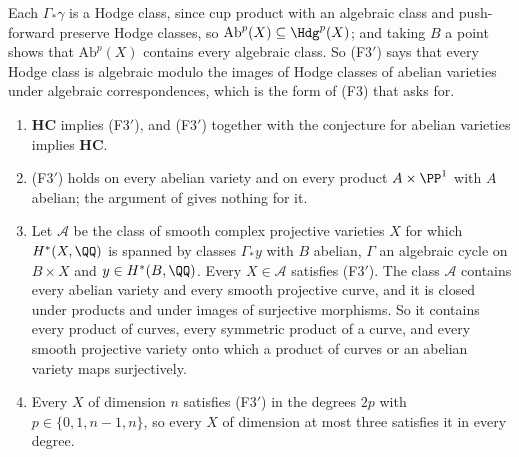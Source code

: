 Each $\Gamma_{*}\gamma$ is a Hodge class, since cup product with an
algebraic class and push-forward preserve Hodge classes, so
$\mathrm{Ab}^{p}(X)\subseteq\Hdg^{p}(X)$; and taking $B$ a point shows that
$\mathrm{Ab}^{p}(X)$ contains every algebraic class. So \textup{(F3$'$)} says
that every Hodge class is algebraic modulo the images of Hodge classes of
abelian varieties under algebraic correspondences, which is the form of (F3)
that  asks for.

\begin{proposition}\label{prop:f3prime}
\leavevmode
\begin{enumerate}[label=\textup{(\roman*)},leftmargin=2.6em]
\item $\mathbf{HC}$ implies \textup{(F3$'$)}, and \textup{(F3$'$)} together
  with the conjecture for abelian varieties implies $\mathbf{HC}$.
\item \textup{(F3$'$)} holds on every abelian variety and on every product
  $A\times\PP^{1}$ with $A$ abelian; the argument of  gives
  nothing for it.
\item Let $\mathcal{A}$ be the class of smooth complex projective varieties
  $X$ for which $H^{*}(X,\QQ)$ is spanned by classes $\Gamma_{*}y$ with $B$
  abelian, $\Gamma$ an algebraic cycle on $B\times X$ and
  $y\in H^{*}(B,\QQ)$. Every $X\in\mathcal{A}$ satisfies \textup{(F3$'$)}.
  The class $\mathcal{A}$ contains every abelian variety and every smooth
  projective curve, and it is closed under products and under images of
  surjective morphisms. So it contains every product of curves, every
  symmetric product of a curve, and every smooth projective variety onto
  which a product of curves or an abelian variety maps surjectively.
\item Every $X$ of dimension $n$ satisfies \textup{(F3$'$)} in the degrees
  $2p$ with $p\in\{0,1,n-1,n\}$, so every $X$ of dimension at most three
  satisfies it in every degree.
\end{enumerate}
\end{proposition}


